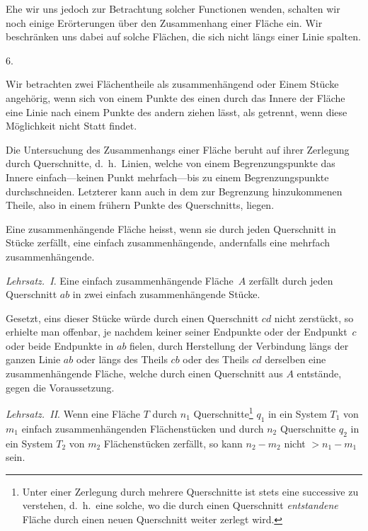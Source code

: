 \documentclass[a4paper,12pt]{article}
\begin{document}
Ehe wir uns jedoch zur Betrachtung solcher Functionen wenden,
schalten wir noch einige Er\"{o}rterungen \"{u}ber den
Zusammenhang einer Fl\"{a}che ein.  Wir beschr\"{a}nken uns dabei
auf solche Fl\"{a}chen, die sich nicht l\"{a}ngs einer Linie
spalten.

\medbreak

\centerline{6.}

\nobreak\medskip

Wir betrachten zwei Fl\"{a}chentheile als zusammenh\"{a}ngend
oder Einem St\"{u}cke angeh\"{o}rig, wenn sich von einem Punkte
des einen durch das Innere der Fl\"{a}che eine Linie nach einem
Punkte des andern ziehen l\"{a}sst, als getrennt, wenn diese
M\"{o}glichkeit nicht Statt findet.

Die Untersuchung des Zusammenhangs einer Fl\"{a}che beruht auf
ihrer Zerlegung durch Querschnitte, d.~h.\ Linien, welche von
einem Begrenzungspunkte das Innere einfach---keinen Punkt
mehrfach---bis zu einem Begrenzungspunkte durchschneiden.
Letzterer kann auch in dem zur Begrenzung hinzukommenen Theile,
also in einem fr\"{u}hern Punkte des Querschnitts, liegen.

Eine zusammenh\"{a}ngende Fl\"{a}che heisst, wenn sie durch jeden
Querschnitt in St\"{u}cke zerf\"{a}llt, eine einfach
zusammenh\"{a}ngende, andernfalls eine mehrfach
zusammenh\"{a}ngende.

\emph{Lehrsatz.~I}.  Eine einfach zusammenh\"{a}ngende
Fl\"{a}che~$A$ zerf\"{a}llt durch jeden Querschnitt $ab$ in zwei
einfach zusammenh\"{a}ngende St\"{u}cke.

Gesetzt, eins dieser St\"{u}cke w\"{u}rde durch einen Querschnitt
$cd$ nicht zerst\"{u}ckt, so erhielte man offenbar, je nachdem
keiner seiner Endpunkte oder der Endpunkt~$c$ oder beide
Endpunkte in $ab$ fielen, durch Herstellung der Verbindung
l\"{a}ngs der ganzen Linie $ab$ oder l\"{a}ngs des Theils $cb$
oder des Theils $cd$ derselben eine zusammenh\"{a}ngende
Fl\"{a}che, welche durch einen Querschnitt aus $A$ entst\"{a}nde,
gegen die Voraussetzung.

\emph{Lehrsatz.~II}.  Wenn eine Fl\"{a}che $T$ durch
$n_1$ Querschnitte\footnote{Unter einer Zerlegung durch mehrere
Querschnitte ist stets eine successive zu verstehen, d.~h.\ eine
solche, wo die durch einen Querschnitt \emph{entstandene} Fl\"{a}che
durch einen neuen Querschnitt weiter zerlegt wird.}
$q_1$ in ein System $T_1$ von $m_1$ einfach zusammenh\"{a}ngenden
Fl\"{a}chenst\"{u}cken und durch $n_2$ Querschnitte $q_2$ in ein
System $T_2$ von $m_2$ Fl\"{a}chenst\"{u}cken zerf\"{a}llt, so
kann $n_2 - m_2$ nicht $> n_1 - m_1$ sein.
\end{document}
